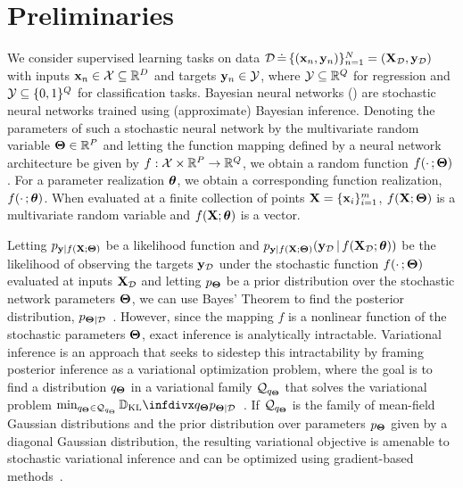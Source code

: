 %



\section{Preliminaries}
\label{sec:preliminaries}

We consider supervised learning tasks on data \mbox{$\mathcal{D} \,\dot{=}\, \{ (\mathbf x_{n}, \mathbf y_{n}) \}_{n=1}^N = (\mathbf X_{\mathcal{D}}, \mathbf y_{\mathcal{D}})$} with inputs \mbox{$\mathbf x_{n} \in \mathcal{X} \subseteq \mathbb{R}^D$} and targets \mbox{$\mathbf y_{n} \in \mathcal{Y}$}, where $\mathcal{Y} \subseteq \mathbb{R}^Q$ for regression and $\mathcal{Y} \subseteq \{0, 1\}^Q$ for classification tasks.
Bayesian neural networks (\bnns) are stochastic neural networks trained using (approximate) Bayesian inference.
Denoting the parameters of such a stochastic neural network by the multivariate random variable $\boldsymbol{\Theta} \in \mathbb{R}^P$ and letting the function mapping defined by a neural network architecture be given by \mbox{$f : \mathcal{X} \times \mathbb{R}^P \rightarrow \mathbb{R}^{Q}$}, we obtain a random function $f(\cdot \,; \boldsymbol{\Theta})$.
%
For a parameter realization ${\boldsymbol{\theta}}$, we obtain a corresponding function realization, $f(\cdot \,; {\boldsymbol{\theta}})$.
When evaluated at a finite collection of points $ \mathbf X = \{ \mathbf x_{i} \}_{i=1}^{m} $, $f(\mathbf X ; \boldsymbol{\Theta})$ is a multivariate random variable and $f(\mathbf X ; {\boldsymbol{\theta}})$ is a vector.

Letting $p_{\mathbf y | f(\mathbf X ; \boldsymbol{\Theta})}$ be a likelihood function and $p_{\mathbf y | f(\mathbf X ; \boldsymbol{\Theta})}(\mathbf y_{\mathcal{D}} \,|\, f(\mathbf X_{\mathcal{D}} ; {\boldsymbol{\theta}}))$ be the likelihood of observing the targets $\mathbf y_{\mathcal{D}}$ under the stochastic function $f(\cdot \,; \boldsymbol{\Theta})$ evaluated at inputs $\mathbf X_{\mathcal{D}}$ and letting $p_{\boldsymbol{\Theta}}$ be a prior distribution over the stochastic network parameters $\boldsymbol{\Theta}$, we can use Bayes' Theorem to find the posterior distribution, $p_{\boldsymbol{\Theta} | \mathcal{D}}$~\citep{mckay1992practical,neal1996bayesian}.
However, since the mapping $f$ is a nonlinear function of the stochastic parameters $\boldsymbol{\Theta}$, exact inference is analytically intractable.
Variational inference is an approach that seeks to sidestep this intractability by framing posterior inference as a variational optimization problem, where the goal is to find a distribution $q_{\boldsymbol{\Theta}}$ in a variational family $\mathcal{Q}_{q_{\boldsymbol{\Theta}}}$ that solves the variational problem \mbox{$\min_{q_{\bTheta} \in \calQ_{q_{\Theta}}} \DKL{q_{\bTheta}}{p_{\bTheta | \calD}}$}~\citep{wainwright2008vi}.
If $\mathcal{Q}_{q_{\boldsymbol{\Theta}}}$ is the family of mean-field Gaussian distributions and the prior distribution over parameters $p_{\boldsymbol{\Theta}}$ given by a diagonal Gaussian distribution, the resulting variational objective is amenable to stochastic variational inference and can be optimized using gradient-based methods~\citep{hinton1993keeping,graves2011practical,hoffman2013svi,blundell2015mfvi}.


%